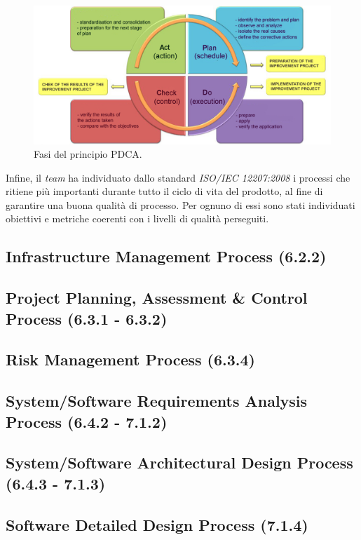 	\begin{figure}[H]
		\centering
		\includegraphics[scale=0.6]{includes/img/pdca.png}
		\caption{Fasi del principio PDCA.}
	\end{figure}

	Infine, il \textit{team} ha individuato dallo standard \textit{ISO/IEC 12207:2008} i processi che ritiene più importanti durante tutto il ciclo di vita del prodotto, al fine di garantire una buona qualità di processo. Per ognuno di essi sono stati individuati obiettivi e metriche coerenti con i livelli di qualità perseguiti.
	
	\subsection{Infrastructure Management Process (6.2.2)}
	
	\subsection{Project Planning, Assessment \& Control Process (6.3.1 - 6.3.2)}
	
	\subsection{Risk Management Process (6.3.4)}
	
	\subsection{System/Software Requirements Analysis Process (6.4.2 - 7.1.2)}
	
	\subsection{System/Software Architectural Design Process (6.4.3 - 7.1.3)}
	
	\subsection{Software Detailed Design Process (7.1.4)}
	
